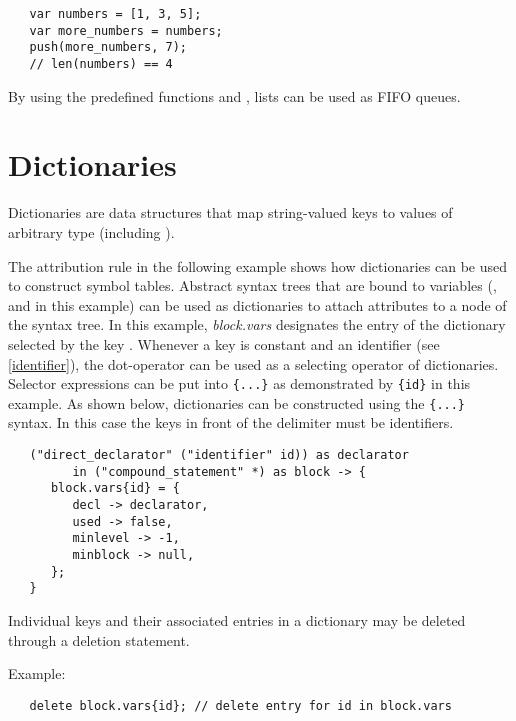 \begin{lstlisting}
   var numbers = [1, 3, 5];
   var more_numbers = numbers;
   push(more_numbers, 7);
   // len(numbers) == 4
\end{lstlisting}

By using the predefined functions  and
, lists can be used as FIFO queues.

\section{Dictionaries}\label{dictionary}

Dictionaries are data structures that map string-valued keys
to values of arbitrary type (including ).

The attribution rule in the following example shows how dictionaries
can be used to construct symbol tables. Abstract syntax trees that are
bound to variables (,  and  in
this example) can be used as dictionaries to attach attributes to a node
of the syntax tree. In this example, \textit{block.vars} designates the
entry of the dictionary  selected by the key .
Whenever a key is constant and an identifier (see \ref{identifier}),
the dot-operator can be used as a selecting operator of dictionaries.
Selector expressions can be put into \lstinline!{...}! as demonstrated
by \lstinline!{id}! in this example. As shown below, dictionaries can be
constructed using the \lstinline!{...}! syntax. In this case the keys in
front of the \token{->} delimiter must be identifiers.

\begin{lstlisting}
   ("direct_declarator" ("identifier" id)) as declarator
         in ("compound_statement" *) as block -> {
      block.vars{id} = {
         decl -> declarator,
         used -> false,
         minlevel -> -1,
         minblock -> null,
      };
   }
\end{lstlisting}

\noindent
Individual keys and their associated entries in a dictionary
may be deleted through a deletion statement.

\bigskip
\noindent
Example:

\begin{lstlisting}
   delete block.vars{id}; // delete entry for id in block.vars
\end{lstlisting}

